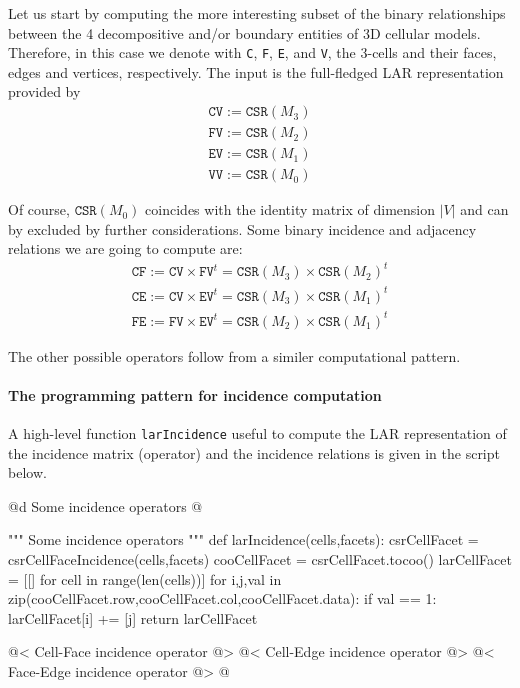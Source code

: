 \documentclass[11pt,oneside]{article}	%
\begin{document}
Let us start by computing the more interesting subset of the binary relationships between the 4 decompositive and/or boundary entities of 3D cellular models.  Therefore, in this case we denote with \texttt{C}, \texttt{F}, \texttt{E}, and \texttt{V}, the 3-cells and their faces, edges and vertices, respectively.
The input is the full-fledged LAR representation provided by 
\begin{align}
\texttt{CV} := \texttt{CSR}(M_3) \\
\texttt{FV} := \texttt{CSR}(M_2) \\
\texttt{EV} := \texttt{CSR}(M_1) \\
\texttt{VV} := \texttt{CSR}(M_0) 
\end{align}

Of course, $\texttt{CSR}(M_0)$ coincides with the identity matrix of dimension $|V|$ and can by excluded by further considerations.
Some binary incidence and adjacency relations we are going to compute are:
\begin{align}
\texttt{CF} := \texttt{CV} \times \texttt{FV}^t = \texttt{CSR}(M_3)\times\texttt{CSR}(M_2)^t \\
\texttt{CE} := \texttt{CV} \times \texttt{EV}^t = \texttt{CSR}(M_3)\times\texttt{CSR}(M_1)^t \\
\texttt{FE} := \texttt{FV} \times \texttt{EV}^t = \texttt{CSR}(M_2)\times\texttt{CSR}(M_1)^t 
\end{align}

The other possible operators follow from a similer computational pattern.

\paragraph{The programming pattern for incidence computation}

A high-level function \texttt{larIncidence} useful to compute the LAR representation of the incidence matrix (operator) and the incidence relations is given in the script below.

@d Some incidence operators
@{""" Some incidence operators """
def larIncidence(cells,facets):
	csrCellFacet = csrCellFaceIncidence(cells,facets)
	cooCellFacet = csrCellFacet.tocoo()
	larCellFacet = [[] for cell in range(len(cells))]
	for i,j,val in zip(cooCellFacet.row,cooCellFacet.col,cooCellFacet.data):
		if val == 1: larCellFacet[i] += [j]
	return larCellFacet

@< Cell-Face incidence operator @>
@< Cell-Edge incidence operator @>
@< Face-Edge incidence operator @>
@}
\end{document}
